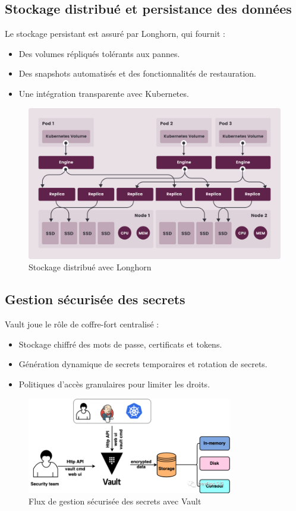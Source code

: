 \subsection{Stockage distribué et persistance des données}

Le stockage persistant est assuré par Longhorn, qui fournit :
\begin{itemize}
	\item Des volumes répliqués tolérants aux pannes.
	\item Des snapshots automatisés et des fonctionnalités de restauration.
	\item Une intégration transparente avec Kubernetes.
\end{itemize}

\begin{figure} [H]
	\centering
	\includegraphics[width=.5\textwidth]{figures/how-longhorn-works.png}
	\caption{Stockage distribué avec Longhorn}
	\label{fig: Stockage distribué avec Longhorn}
\end{figure}

\subsection{Gestion sécurisée des secrets}

Vault joue le rôle de coffre-fort centralisé :
\begin{itemize}
	\item Stockage chiffré des mots de passe, certificats et tokens.
	\item Génération dynamique de secrets temporaires et rotation de secrets.
	\item Politiques d’accès granulaires pour limiter les droits.
\end{itemize}

\begin{figure}[H]
	\centering
	\includegraphics[width=0.8\textwidth]{figures/vault-gestion-secrets.png}
	\caption{Flux de gestion sécurisée des secrets avec Vault}
\end{figure}

